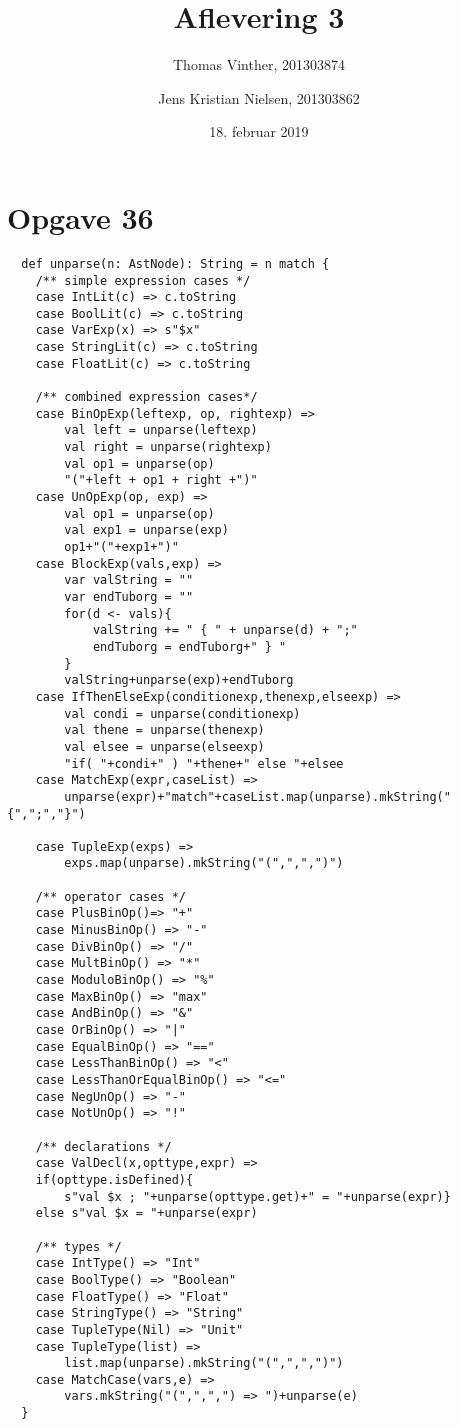 \documentclass[a4paper, 10pt]{article}
\title{Aflevering 3}
\author{Thomas Vinther, 201303874 \and Jens Kristian Nielsen, 201303862}
\date{18. februar 2019}
\begin{document}
\maketitle
\section*{Opgave 36}
\begin{lstlisting}
  def unparse(n: AstNode): String = n match {
  	/** simple expression cases */
  	case IntLit(c) => c.toString
  	case BoolLit(c) => c.toString
  	case VarExp(x) => s"$x"
  	case StringLit(c) => c.toString
  	case FloatLit(c) => c.toString
  	
  	/** combined expression cases*/
  	case BinOpExp(leftexp, op, rightexp) =>
  		val left = unparse(leftexp)
  		val right = unparse(rightexp)
  		val op1 = unparse(op)
  		"("+left + op1 + right +")"
  	case UnOpExp(op, exp) =>
  		val op1 = unparse(op)
  		val exp1 = unparse(exp)
  		op1+"("+exp1+")"
  	case BlockExp(vals,exp) =>
  		var valString = ""
  		var endTuborg = ""
  		for(d <- vals){
  			valString += " { " + unparse(d) + ";"
  			endTuborg = endTuborg+" } "
  		}
  		valString+unparse(exp)+endTuborg
  	case IfThenElseExp(conditionexp,thenexp,elseexp) =>
  		val condi = unparse(conditionexp)
	  	val thene = unparse(thenexp)
  		val elsee = unparse(elseexp)
	  	"if( "+condi+" ) "+thene+" else "+elsee
  	case MatchExp(expr,caseList) =>
  		unparse(expr)+"match"+caseList.map(unparse).mkString("{",";","}")
  	
  	case TupleExp(exps) =>
  		exps.map(unparse).mkString("(",",",")")
  	
  	/** operator cases */
  	case PlusBinOp()=> "+"
  	case MinusBinOp() => "-"
  	case DivBinOp() => "/"
  	case MultBinOp() => "*"
  	case ModuloBinOp() => "%"
  	case MaxBinOp() => "max"
  	case AndBinOp() => "&"
  	case OrBinOp() => "|"
  	case EqualBinOp() => "=="
  	case LessThanBinOp() => "<"
  	case LessThanOrEqualBinOp() => "<="
  	case NegUnOp() => "-"
  	case NotUnOp() => "!"
  	
  	/** declarations */
  	case ValDecl(x,opttype,expr) =>
  	if(opttype.isDefined){
  		s"val $x ; "+unparse(opttype.get)+" = "+unparse(expr)}
  	else s"val $x = "+unparse(expr)
  	
  	/** types */
  	case IntType() => "Int"
  	case BoolType() => "Boolean"
  	case FloatType() => "Float"
  	case StringType() => "String"
  	case TupleType(Nil) => "Unit"
  	case TupleType(list) =>
  		list.map(unparse).mkString("(",",",")")
  	case MatchCase(vars,e) =>
  		vars.mkString("(",",",") => ")+unparse(e)
  }
\end{lstlisting}
\end{document}
